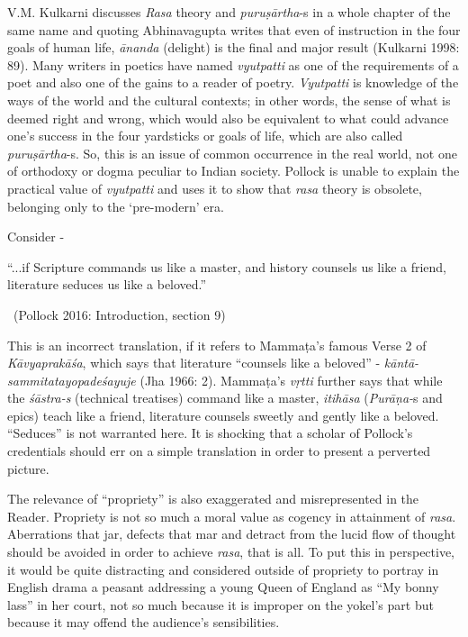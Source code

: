 V.M. Kulkarni discusses \textit{Rasa} theory and \textit{puruṣārtha}-s in a whole chapter of the same name and quoting Abhinavagupta writes that even of instruction in the four goals of human life, \textit{ānanda} (delight) is the final and major result (Kulkarni 1998: 89). Many writers in poetics have named \textit{vyutpatti} as one of the requirements of a poet and also one of the gains to a reader of poetry. \textit{Vyutpatti} is knowledge of the ways of the world and the cultural contexts; in other words, the sense of what is deemed right and wrong, which would also be equivalent to what could advance one’s success in the four yardsticks or goals of life, which are also called \textit{puruṣārtha}-s. So, this is an issue of common occurrence in the real world, not one of orthodoxy or dogma peculiar to Indian society. Pollock is unable to explain the practical value of \textit{vyutpatti }and uses it to show that \textit{rasa} theory is obsolete, belonging only to the ‘pre-modern’ era.

Consider -

\begin{myquote}
“...if Scripture commands us like a master, and history counsels us like a friend, literature seduces us like a beloved.” 

~\hfill (Pollock 2016: Introduction, section 9)
\end{myquote}

This is an incorrect translation, if it refers to Mammaṭa’s famous Verse 2 of \textit{Kāvyaprakāśa}, which says that literature “counsels like a beloved” -\textit{ kāntā-sammitatayopadeśayuje }(Jha 1966: 2). Mammaṭa’s \textit{vṛtti} further says that while the \textit{śāstra-s }(technical treatises) command like a master, \textit{itihāsa} (\textit{Purāṇa-}s and epics) teach like a friend, literature counsels sweetly and gently like a beloved. “Seduces” is not warranted here. It is shocking that a scholar of Pollock’s credentials should err on a simple translation in order to present a perverted picture.

The relevance of “propriety” is also exaggerated and misrepresented in the Reader. Propriety is not so much a moral value as cogency in attainment of \textit{rasa}. Aberrations that jar, defects that mar and detract from the lucid flow of thought should be avoided in order to achieve \textit{rasa}, that is all. To put this in perspective, it would be quite distracting and considered outside of propriety to portray in English drama a peasant addressing a young Queen of England as “My bonny lass” in her court, not so much because it is improper on the yokel’s part but because it may offend the audience’s sensibilities.

